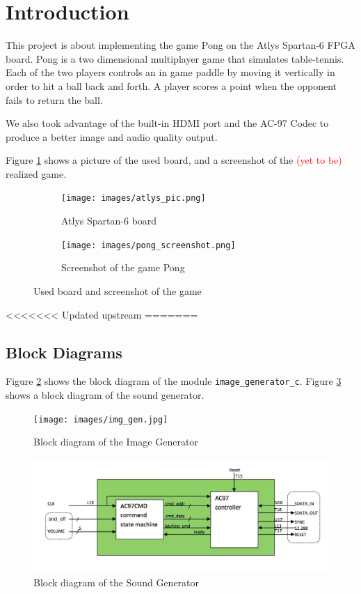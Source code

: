 \section{Introduction}
	This project is about implementing the game Pong on the Atlys Spartan-6 FPGA board. Pong is a two dimensional multiplayer game that simulates table-tennis. Each of the two players controls an in game paddle by moving it vertically in order to hit a ball back and forth. A player scores a point when the opponent fails to return the ball. 
	
	We also took advantage of the built-in HDMI port and the AC-97 Codec to produce a better image and audio quality output. 
	
	Figure \ref{board+screenshot} shows a picture of the used board, and a screenshot of the \textcolor{red}{(yet to be)} realized game. 
	
	\begin{figure}[h]
		\begin{subfigure}[b]{.4\textwidth}
			\texttt{[image: images/atlys\_pic.png]}
			\caption{Atlys Spartan-6 board}
		\end{subfigure}
		\hfill
		\begin{subfigure}[b]{.4\textwidth}
			\texttt{[image: images/pong\_screenshot.png]}		
			\caption{Screenshot of the game Pong}
		\end{subfigure}
		
	\caption{Used board and screenshot of the game}
	\label{board+screenshot}
	\end{figure}
	
<<<<<<< Updated upstream
=======
	
	\subsection{Block Diagrams}
		Figure \ref{img_gen} shows the block diagram of the module \texttt{image\_generator\_c}. Figure \ref{snd_gen} shows a block diagram of the sound generator. 
		
	\begin{figure}[here]
		\centering
		\texttt{[image: images/img\_gen.jpg]}
		\caption{Block diagram of the Image Generator}
		\label{img_gen}
	\end{figure}
	
	\begin{figure}[here]
		\centering
		\includegraphics[scale=0.5]{images/snd_gen.png}
		\caption{Block diagram of the Sound Generator}
		\label{snd_gen}
	\end{figure}
	
